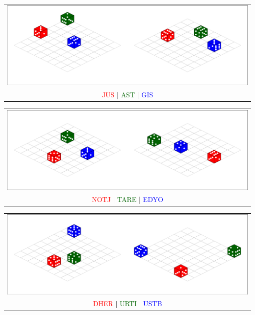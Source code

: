   \newpage



  \begin{center}
    \begin{tabular}{c}
      \includegraphics[width=0.8\linewidth]{diceBlue02.png}
      \\
      \textcolor{red}{JUS} |
      \textcolor{darkGreen}{AST} |
      \textcolor{blue}{GIS}
    \end{tabular}
  \end{center}


  \vfill


  \begin{center}
    \begin{tabular}{c}
      \includegraphics[width=0.8\linewidth]{diceRed03.png}
      \\
      \textcolor{red}{NOTJ} |
      \textcolor{darkGreen}{TARE} |
      \textcolor{blue}{EDYO}
    \end{tabular}
  \end{center}


  \vfill


  \begin{center}
    \begin{tabular}{c}
      \includegraphics[width=0.8\linewidth]{diceBlue03.png}
      \\
      \textcolor{red}{DHER} |
      \textcolor{darkGreen}{URTI} |
      \textcolor{blue}{USTB}
    \end{tabular}
  \end{center}


